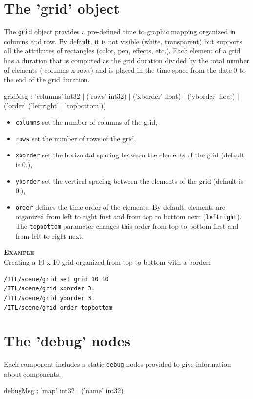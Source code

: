 \documentclass[a4paper,twoside]{report}
\newcommand{\sublevel}[1]	{\section{#1}}
\newcommand{\OSC}[1]		{\texttt{#1}}
\newcommand{\example}		{\textbf{\hspace{-1.5cm}\textbf{\textsc{Example }}}}
\newcommand{\sample}	[1]			{\vspace{-2mm}\begin{center}\colorbox{mygrey}{
								\begin{minipage}[t]{0.9\columnwidth} 
								{\small \texttt{#1}}
								\end{minipage}}\end{center}}
\begin{document}
\sublevel{The 'grid' object}
\label{grid}

The \OSC{grid} object provides a pre-defined time to graphic mapping organized in columns and row. By default, it is not visible (white, transparent) but supports all the attributes of rectangles (color, pen, effects, etc.). Each element of a grid has a duration that is computed as the grid duration divided by the total number of elements ( columns x rows) and is placed in the time space from the date 0 to the end of the grid duration.

\begin{rail}
gridMsg : 'columns' int32
		| ('rows' int32) 
		| ('xborder' float)
		| ('yborder' float)
		| ('order' ('leftright' | 'topbottom'))
\end{rail}

\begin{itemize}
\item \OSC{columns} set the number of columns of the grid,
\item \OSC{rows} set the number of rows of the grid,
\item \OSC{xborder} set the horizontal spacing between the elements of the grid (default is 0.),
\item \OSC{yborder} set the vertical spacing between the elements of the grid (default is 0.),
\item \OSC{order} defines the time order of the elements. By default, elements are organized from left to right first and from top to bottom next (\OSC{leftright}). The \OSC{topbottom} parameter changes this order from top to bottom first and from left to right next.
\end{itemize}

\example \\
Creating a 10 x 10 grid organized from top to bottom with a border:
\sample{/ITL/scene/grid set grid 10 10\\
/ITL/scene/grid xborder 3. \\
/ITL/scene/grid yborder 3. \\
/ITL/scene/grid order topbottom
}

\sublevel{The 'debug' nodes}
\label{debugnode}

Each component includes a static \OSC{debug} nodes provided to give information about components.
\begin{rail}
debugMsg : 'map' int32
		| ('name' int32) 
\end{rail}
\end{document}
